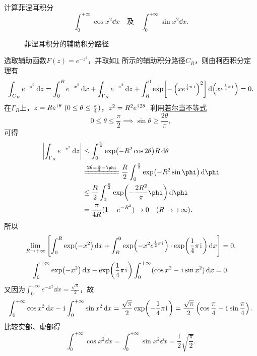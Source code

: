 \begin{example}
计算菲涅耳积分\[
\int_0^{+\infty} \cos x^2 \dd{x}
\quad\text{及}\quad
\int_0^{+\infty} \sin x^2 \dd{x}.
\]
\begin{solution}
\begin{figure}[ht]
\centering
{}
\caption{菲涅耳积分的辅助积分路径}
\label{figure:留数定理.菲涅耳积分的辅助积分路径}
\end{figure}

选取辅助函数\(F(z) = e^{-z^2}\)，并取如\cref{figure:留数定理.菲涅耳积分的辅助积分路径} 所示的辅助积分路径\(C_R\)，则由柯西积分定理有\[
\int_{C_R} e^{-z^2} \dd{z}
= \int_0^R e^{-x^2} \dd{x}
+ \int_{\Gamma_R} e^{-z^2} \dd{z}
+ \int_R^0 \exp[-\left(x e^{\frac{1}{4}\pi\kern1pt\mathrm{i}\kern1pt}\right)^2] \dd(x e^{\frac{1}{4}\pi\kern1pt\mathrm{i}\kern1pt})
= 0.
\]
在\(\Gamma_R\)上，\(z = R e^{\iu\theta}\ (0\leq\theta\leq\frac{\pi}{4})\)，\(z^2 = R^2 e^{\kern1pt\mathrm{i}\kern1pt2\theta}\).
利用\hyperref[equation:微分中值定理.若尔当不等式]{若尔当不等式}\[
0\leq\theta\leq\frac{\pi}{2}
\implies
\sin\theta\geq\frac{2\theta}{\pi},
\]可得\begin{align*}
\abs{\int_{\Gamma_R} e^{-z^2} \dd{z}}
&\leq
\int_0^{\frac{\pi}{4}} \exp(-R^2 \cos2\theta) R\dd{\theta} \\
&\xlongequal{2\theta=\frac{\pi}{2}-\phi}
\frac{R}{2} \int_0^{\frac{\pi}{2}} \exp(-R^2 \sin\phi) \dd{\phi} \\
&\leq
\frac{R}{2} \int_0^{\frac{\pi}{2}} \exp(-\frac{2R^2}{\pi}\phi) \dd{\phi} \\
&= \frac{\pi}{4R} (1-e^{-R^2})
\to0\quad(R\to+\infty).
\end{align*}
所以\[
\lim_{R\to+\infty} \left[
\int_0^R \exp(-x^2) \dd{x}
+ \int_R^0 \exp(-x^2 e^{\frac{1}{2}\pi\kern1pt\mathrm{i}\kern1pt}) \cdot \exp(\frac{1}{4}\pi\kern1pt\mathrm{i}\kern1pt) \dd{x}
\right] = 0,
\]\[
\int_0^{+\infty} \exp(-x^2) \dd{x} - \exp(\frac{1}{4}\pi\kern1pt\mathrm{i}\kern1pt) \int_0^{+\infty} (\cos x^2 - \kern1pt\mathrm{i}\kern1pt \sin x^2) \dd{x} = 0.
\]又因为\(\int_0^{+\infty} e^{-x^2} \dd{x} = \frac{\sqrt{\pi}}{2}\)，故\[
\int_0^{+\infty} \cos x^2 \dd{x}
- \kern1pt\mathrm{i}\kern1pt \int_0^{+\infty} \sin x^2 \dd{x}
= \frac{\sqrt{\pi}}{2} \exp(-\frac{1}{4}\pi\kern1pt\mathrm{i}\kern1pt)
= \frac{\sqrt{\pi}}{2} \left(\cos\frac{\pi}{4} - \kern1pt\mathrm{i}\kern1pt \sin\frac{\pi}{4}\right).
\]比较实部、虚部得\begin{equation}\label{equation:留数定理.菲涅耳积分}
\int_0^{+\infty} \cos x^2 \dd{x}
= \int_0^{+\infty} \sin x^2 \dd{x}
= \frac{1}{2} \sqrt{\frac{\pi}{2}}.
\end{equation}
\end{solution}
\end{example}

